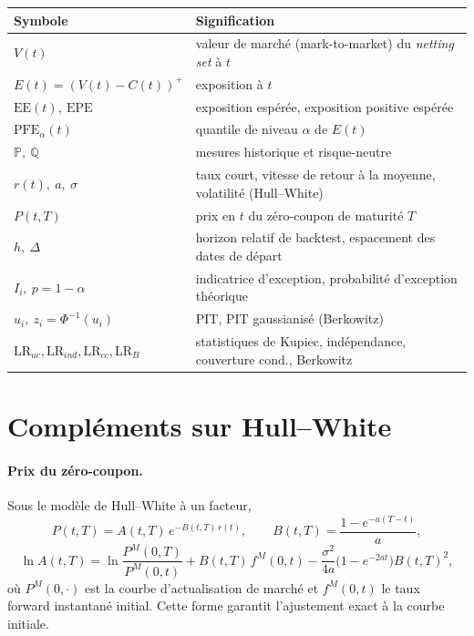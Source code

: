 \documentclass[11pt,a4paper]{article}
\newcommand{\PFE}{\mathrm{PFE}}
\newcommand{\EE}{\mathrm{EE}}
\newcommand{\EPE}{\mathrm{EPE}}
\newcommand{\Prob}{\mathbb{P}}
\newcommand{\Qmeas}{\mathbb{Q}}
\newcommand{\LRuc}{\mathrm{LR}_{uc}}
\newcommand{\LRind}{\mathrm{LR}_{ind}}
\newcommand{\LRcc}{\mathrm{LR}_{cc}}
\newcommand{\LRB}{\mathrm{LR}_{B}}
\theoremstyle{remark}
\begin{document}
\begin{table}[h]
\centering
\small
\renewcommand{\arraystretch}{1.25}
\begin{tabularx}{\linewidth}{@{}l X@{}}
\toprule
\textbf{Symbole} & \textbf{Signification} \\
\midrule
$V(t)$ & valeur de marché (mark-to-market) du \emph{netting set} à $t$ \\
$E(t) = (V(t)-C(t))^+$ & exposition à $t$ \\
$\EE(t),\ \EPE$ & exposition espérée, exposition positive espérée \\
$\PFE_\alpha(t)$ & quantile de niveau $\alpha$ de $E(t)$ \\
$\Prob,\ \Qmeas$ & mesures historique et risque-neutre \\
$r(t),\ a,\ \sigma$ & taux court, vitesse de retour à la moyenne, volatilité (Hull--White) \\
$P(t,T)$ & prix en $t$ du zéro-coupon de maturité $T$ \\
$h,\ \Delta$ & horizon relatif de backtest, espacement des dates de départ \\
$I_i,\ p=1-\alpha$ & indicatrice d'exception, probabilité d'exception théorique \\
$u_i,\ z_i=\Phi^{-1}(u_i)$ & PIT, PIT gaussianisé (Berkowitz) \\
$\LRuc,\LRind,\LRcc,\LRB$ & statistiques de Kupiec, indépendance, couverture cond., Berkowitz \\
\bottomrule
\end{tabularx}
\end{table}

\section{Compléments sur Hull--White}
\label{app:hw}

\paragraph{Prix du zéro-coupon.} Sous le modèle de Hull--White à un facteur,
\begin{equation}
P(t,T) = A(t,T)\,e^{-B(t,T)\,r(t)}, \qquad B(t,T) = \frac{1-e^{-a(T-t)}}{a},
\end{equation}
\begin{equation}
\ln A(t,T) = \ln\frac{P^{M}(0,T)}{P^{M}(0,t)} + B(t,T)\,f^{M}(0,t) - \frac{\sigma^2}{4a}\big(1-e^{-2at}\big)B(t,T)^2,
\end{equation}
où $P^{M}(0,\cdot)$ est la courbe d'actualisation de marché et $f^{M}(0,t)$ le taux forward instantané initial. Cette forme garantit l'ajustement exact à la courbe initiale.
\end{document}

